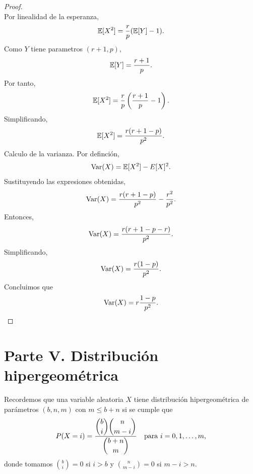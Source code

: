 \documentclass[12pt,a4paper]{article}
\newcommand{\paren}[1]{\left( #1 \right)}
\begin{document}
\begin{proof}
\begin{equation*}
        \end{equation*}
        Por linealidad de la esperanza,
        \begin{equation*}
            \mathbb{E}[X^{2}]=\frac{r}{p}(\mathbb{E}[Y]-1).
        \end{equation*}
        Como $Y$ tiene parametros $(r+1,p)$,
        \begin{equation*}
            \mathbb{E}[Y]=\frac{r+1}{p}.
        \end{equation*}
        Por tanto,
        \begin{equation*}
            \E[X^{2}]=\frac{r}{p}\paren{\frac{r+1}{p}-1}.
        \end{equation*}
        Simplificando,
        \begin{equation*}
            \mathbb{E}[X^{2}]=\frac{r(r+1-p)}{p^{2}}.
        \end{equation*}
        Calculo de la varianza. Por definción,
        \begin{equation*}
            \operatorname{Var}(X)=\mathbb{E}[X^{2}]-E[X]^{2}.
        \end{equation*}
        Sustituyendo las expresiones obtenidas,
        \begin{equation*}
            \operatorname{Var}(X)=\frac{r(r+1-p)}{p^{2}}-\frac{r^{2}}{p^{2}}.
        \end{equation*}
        Entonces,
        \begin{equation*}
            \operatorname{Var}(X)=\frac{r(r+1-p-r)}{p^{2}}.
        \end{equation*}
        Simplificando,
        \begin{equation*}
            \operatorname{Var}(X)=\frac{r(1-p)}{p^{2}}.
        \end{equation*}
        Concluimos que
        \begin{equation*}
            \operatorname{Var}(X)=r\frac{1-p}{p^{2}}.
        \end{equation*}
    \end{proof}

    \section*{Parte V. Distribución hipergeométrica}

    Recordemos que una variable aleatoria $X$ tiene distribución hipergeométrica de parámetros $(b, n, m)$
    con $m \leq b + n$ si se cumple que
    \begin{equation*}
        P(X = i) = \frac{\dbinom{b}{i}\dbinom{n}{m-i}}{\dbinom{b+n}{m}} \quad \text{para } i = 0, 1, \ldots, m,
    \end{equation*}
    donde tomamos $\binom{b}{i} = 0$ si $i > b$ y $\binom{n}{m-i} = 0$ si $m - i > n$.
\end{document}
